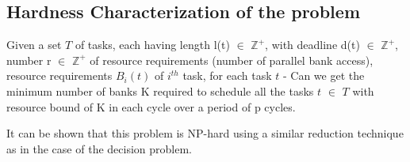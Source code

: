 \subsection{Hardness Characterization of the problem}\label{hcp}
\noindent
\begin{problem}
 Given a set $T$ of tasks, each having length l(t) $\in$ $\mathbb{Z^{+}}$, with deadline d(t) $\in$ $\mathbb{Z^{+}}$, 
 number r $\in$ $\mathbb{Z^{+}}$ of resource requirements (number of parallel bank access), resource requirements $B_{i}(t)$ 
 of $i^{th}$ task, for each task $t$ - Can we get the minimum number of banks K required to schedule all the tasks $t$ $\in$ $T$ 
 with resource bound of K in each cycle over a period of p cycles.
\end{problem}
\noindent
It can be shown that this problem is NP-hard using a similar reduction technique as in the case of the decision problem.
% 
